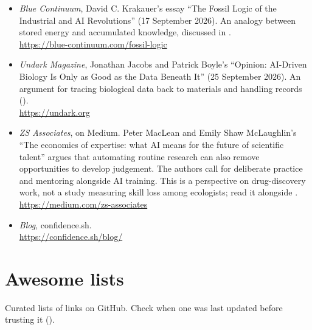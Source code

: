 \begin{itemize}
    (30 September 2026) follows video detections into a database queried through
    a language-model interface. It describes read-only database access through
    MCP and application checks that restrict queries to the selected video.
    This is an implementation example, not evidence of ecological accuracy.
    These are vendor perspectives;  discuss
    their practical implications.\\
    \url{https://www.redhat.com/en/blog}
  \item \emph{Blue Continuum}, David C. Krakauer's essay
    ``The Fossil Logic of the Industrial and AI Revolutions''
    (17 September 2026). An analogy between stored energy and accumulated
    knowledge, discussed in .\\
    \url{https://blue-continuum.com/fossil-logic}
  \item \emph{Undark Magazine}, Jonathan Jacobs and Patrick Boyle's
    ``Opinion: AI-Driven Biology Is Only as Good as the Data Beneath It''
    (25 September 2026). An argument for tracing biological data back to
    materials and handling records ().\\
    \url{https://undark.org}
  \item \emph{ZS Associates}, on Medium. Peter MacLean and Emily Shaw
    McLaughlin's ``The economics of expertise: what AI means for the future
    of scientific talent'' argues that automating routine research can also
    remove opportunities to develop judgement. The authors call for deliberate
    practice and mentoring alongside AI training. This is a perspective on
    drug-discovery work, not a study measuring skill loss among ecologists;
    read it alongside .\\
    \url{https://medium.com/zs-associates}
  \item \emph{Blog}, confidence.sh.\\
    \url{https://confidence.sh/blog/}
\end{itemize}

\section{Awesome lists}

Curated lists of links on GitHub. Check when one was last updated before
trusting it ().

